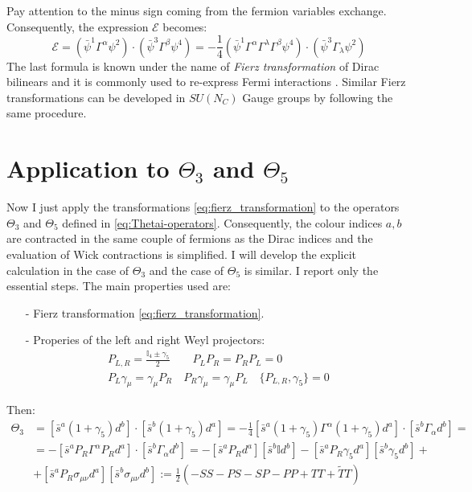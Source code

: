 \documentclass[english, LaM, oneside, noexaminfo]{sapthesis}
\begin{document}
Pay attention to the minus sign coming from the fermion variables exchange.
Consequently, the expression $\mathcal{E}$ becomes:
\begin{equation}\label{eq:fierz_transformation}
    \mathcal{E} = \left(\bar\psi^1 \Gamma^\alpha \psi^2 \right)\cdot\left(\bar\psi^3 \Gamma^\beta \psi^4 \right) = -\frac{1}{4} \left(\bar\psi^1 \Gamma^\alpha \Gamma^\lambda \Gamma^\beta \psi^4\right) \cdot \left(\bar\psi^3 \Gamma_\lambda \psi^2 \right)
\end{equation}
The last formula is known under the name of \textit{Fierz transformation} of Dirac bilinears and it is commonly used to re-express Fermi interactions \cite{Itzykson-Zuber}.
Similar Fierz transformations can be developed in $SU(N_C)$ Gauge groups by following the same procedure.

\section{Application to $\Theta_3$ and $\Theta_5$}
\noindent
Now I just apply the transformations \ref{eq:fierz_transformation} to the operators $\Theta_3$ and $\Theta_5$ defined in \ref{eq:Thetai-operators}.
Consequently, the colour indices $a,b$ are contracted in the same couple of fermions as the Dirac indices and the evaluation of Wick contractions is simplified.
I will develop the explicit calculation in the case of $\Theta_3$ and the case of $\Theta_5$ is similar.
\newline
I report only the essential steps. The main properties used are:
\begin{itemize}
    \item [-] Fierz transformation \ref{eq:fierz_transformation}.
    \item [-] Properies of the left and right Weyl projectors:
        \begin{equation*}
            \begin{gathered}
                P_{L,R} = \frac{\mathbb{I}_4 \pm \gamma_5}{2} \qquad P_L P_R = P_R P_L = 0 \\
                P_L \gamma_\mu = \gamma_\mu P_R \quad P_R \gamma_\mu = \gamma_\mu P_L \quad \{ P_{L,R},\gamma_5 \} = 0
             \end{gathered}
        \end{equation*}
\end{itemize}
Then:
\begin{equation*}
    \begin{aligned}
        \Theta_3 
        & = [\bar s^a  (1+\gamma_5) d^b ] \cdot [ \bar s^b (1+\gamma_5) d^a ] = -\frac{1}{4}[\bar s^a  (1+\gamma_5) \Gamma^\alpha (1+\gamma_5) d^a ] \cdot [ \bar s^b \Gamma_\alpha d^b ] = \\
        & = - [\bar s^a P_R \Gamma^\alpha P_R d^a ] \cdot [ \bar s^b \Gamma_\alpha d^b ] =  - [\bar s^a P_R d^a ][ \bar s^b \mathbb{I} d^b ] - [\bar s^a P_R \gamma_5 d^a ][ \bar s^b \gamma_5 d^b ] + \\
        & + [\bar s^a P_R \sigma_{\mu\nu} d^a ][ \bar s^b \sigma_{\mu\nu} d^b ] := \frac{1}{2}\left(-SS-PS-SP-PP+TT+\tilde{T}T\right)\\
    \end{aligned}
\end{equation*}
\end{document}
